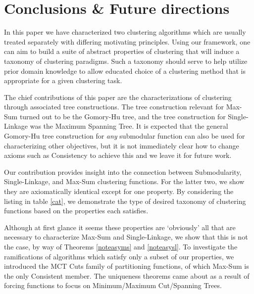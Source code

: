 \documentclass[twoside,11pt]{article}
\begin{document}
\section{Conclusions \& Future directions}

In this paper we have characterized two clustering algorithms which are usually treated separately with differing motivating principles. Using our framework, one can aim to build a suite of abstract properties of clustering that will induce a taxonomy of clustering paradigms. Such a taxonomy should serve to help utilize prior domain knowledge to allow educated choice of a clustering method that is appropriate for a given clustering task.

The chief contributions of this paper are the characterizations of clustering through associated tree constructions. The tree construction relevant for Max-Sum turned out to be the Gomory-Hu tree, and the tree construction for Single-Linkage was the Maximum Spanning Tree. It is expected that the general Gomory-Hu tree construction for \textit{any} submodular function can also be used for characterizing other objectives, but it is not immediately clear how to change axioms such as Consistency to achieve this and we leave it for future work.

Our contribution provides insight into the connection between Submodularity, Single-Linkage, and Max-Sum clustering functions. For the latter two, we show they are axiomatically identical except for one property. By considering the listing in table \ref{cat}, we demonstrate the type of desired taxonomy of clustering functions based on the properties each satisfies. 

Although at first glance it seems these properties are `obviously' all that are necessary to characterize Max-Sum and Single-Linkage, we show that this is not the case, by way of Theorems \ref{noteasyms} and \ref{noteasysl}. To investigate the ramifications of algorithms which satisfy only a subset of our properties, we introduced the MCT Cuts family of partitioning functions, of which Max-Sum is the only Consistent member. The uniqueness theorems came about as a result of forcing functions to focus on Minimum/Maximum Cut/Spanning Trees.






\newpage




\vskip 0.2in

\end{document}

